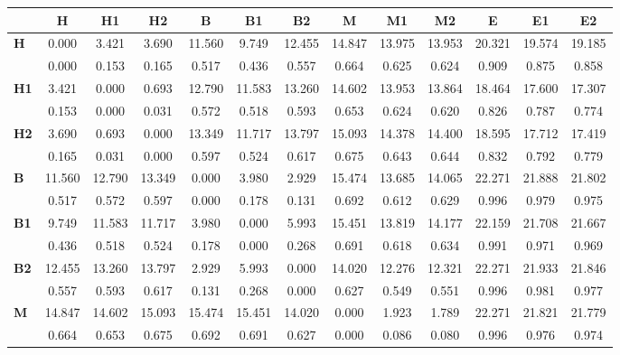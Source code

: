 \begin{table*}[h!]
\begin{center}
\begin{tabular}{| l || c | c | c || c | c | c || c | c | c || c | c | c |}\hline
 & {\bf H} & {\bf H1} & {\bf H2} & {\bf B} & {\bf B1} & {\bf B2} & {\bf M} & {\bf M1} & {\bf M2} & {\bf E} & {\bf E1} & {\bf E2} \\\hline\hline
{\bf H} & 0.000 & 3.421 & 3.690 & 11.560 & 9.749 & 12.455 & 14.847 & 13.975 & 13.953 & 20.321 & 19.574 & 19.185 \\
 & 0.000  & 0.153  & 0.165  & 0.517  & 0.436  & 0.557  & 0.664  & 0.625  & 0.624  & 0.909  & 0.875  & 0.858 \\\hline
{\bf H1} & 3.421 & 0.000 & 0.693 & 12.790 & 11.583 & 13.260 & 14.602 & 13.953 & 13.864 & 18.464 & 17.600 & 17.307 \\
 & 0.153  & 0.000  & 0.031  & 0.572  & 0.518  & 0.593  & 0.653  & 0.624  & 0.620  & 0.826  & 0.787  & 0.774 \\\hline
{\bf H2} & 3.690 & 0.693 & 0.000 & 13.349 & 11.717 & 13.797 & 15.093 & 14.378 & 14.400 & 18.595 & 17.712 & 17.419 \\
 & 0.165  & 0.031  & 0.000  & 0.597  & 0.524  & 0.617  & 0.675  & 0.643  & 0.644  & 0.832  & 0.792  & 0.779 \\\hline\hline
{\bf B} & 11.560 & 12.790 & 13.349 & 0.000 & 3.980 & 2.929 & 15.474 & 13.685 & 14.065 & 22.271 & 21.888 & 21.802 \\
 & 0.517  & 0.572  & 0.597  & 0.000  & 0.178  & 0.131  & 0.692  & 0.612  & 0.629  & 0.996  & 0.979  & 0.975 \\\hline
{\bf B1} & 9.749 & 11.583 & 11.717 & 3.980 & 0.000 & 5.993 & 15.451 & 13.819 & 14.177 & 22.159 & 21.708 & 21.667 \\
 & 0.436  & 0.518  & 0.524  & 0.178  & 0.000  & 0.268  & 0.691  & 0.618  & 0.634  & 0.991  & 0.971  & 0.969 \\\hline
{\bf B2} & 12.455 & 13.260 & 13.797 & 2.929 & 5.993 & 0.000 & 14.020 & 12.276 & 12.321 & 22.271 & 21.933 & 21.846 \\
 & 0.557  & 0.593  & 0.617  & 0.131  & 0.268  & 0.000  & 0.627  & 0.549  & 0.551  & 0.996  & 0.981  & 0.977 \\\hline\hline
{\bf M} & 14.847 & 14.602 & 15.093 & 15.474 & 15.451 & 14.020 & 0.000 & 1.923 & 1.789 & 22.271 & 21.821 & 21.779 \\
 & 0.664  & 0.653  & 0.675  & 0.692  & 0.691  & 0.627  & 0.000  & 0.086  & 0.080  & 0.996  & 0.976  & 0.974 \\\hline

\end{tabular}
\end{center}
\end{table*}

